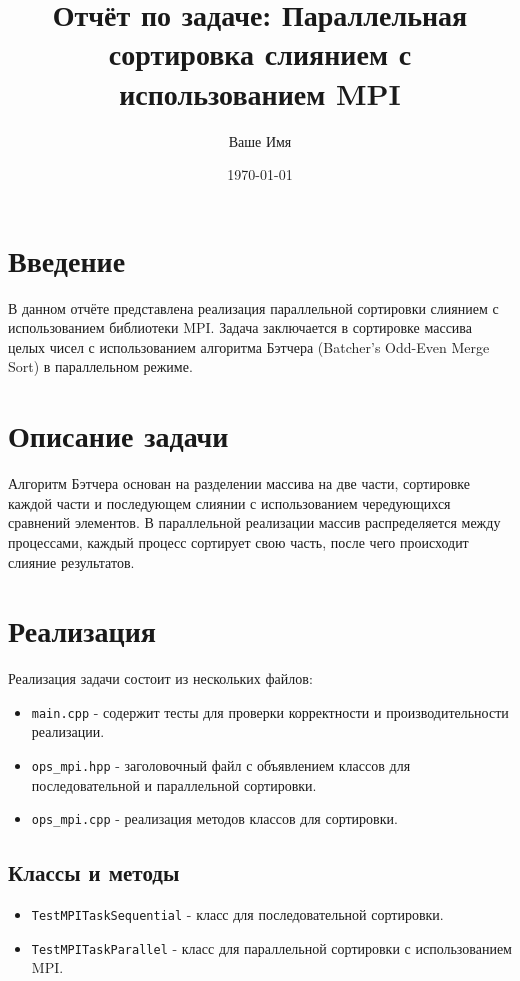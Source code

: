 \documentclass[12pt]{article}
\begin{document}
\title{Отчёт по задаче: Параллельная сортировка слиянием с использованием MPI}
\author{Ваше Имя}
\date{\today}
\maketitle

\section{Введение}
В данном отчёте представлена реализация параллельной сортировки слиянием с использованием библиотеки MPI. Задача заключается в сортировке массива целых чисел с использованием алгоритма Бэтчера (Batcher's Odd-Even Merge Sort) в параллельном режиме.

\section{Описание задачи}
Алгоритм Бэтчера основан на разделении массива на две части, сортировке каждой части и последующем слиянии с использованием чередующихся сравнений элементов. В параллельной реализации массив распределяется между процессами, каждый процесс сортирует свою часть, после чего происходит слияние результатов.

\section{Реализация}
Реализация задачи состоит из нескольких файлов:
\begin{itemize}
    \item \texttt{main.cpp} - содержит тесты для проверки корректности и производительности реализации.
    \item \texttt{ops\_mpi.hpp} - заголовочный файл с объявлением классов для последовательной и параллельной сортировки.
    \item \texttt{ops\_mpi.cpp} - реализация методов классов для сортировки.
\end{itemize}

\subsection{Классы и методы}
\begin{itemize}
    \item \texttt{TestMPITaskSequential} - класс для последовательной сортировки.
    \item \texttt{TestMPITaskParallel} - класс для параллельной сортировки с использованием MPI.
\end{itemize}
\end{document}
